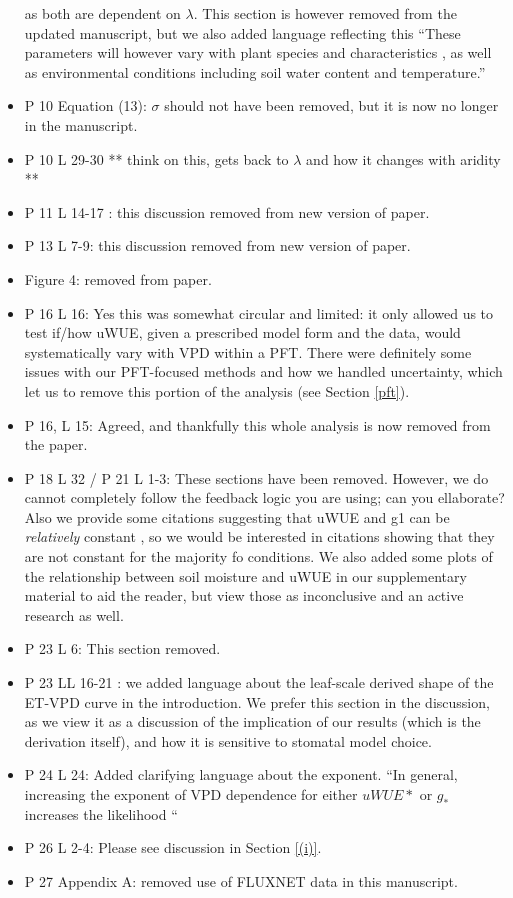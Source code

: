 \documentclass[12pt]{article}
\begin{document}
\begin{itemize}
  as both are dependent on $\lambda$. This section is however removed
  from the updated manuscript, but we also added language reflecting
  this ``These parameters will however vary with plant species and
  characteristics \citep[e.g. wood density, ][]{Lin_2015}, as well as
  environmental conditions including soil water content
  \citep{Manzoni2013} and temperature.''
\item P 10 Equation (13): $\sigma$ should not have been removed, but
  it is now no longer in the manuscript.
\item P 10 L 29-30 ** think on this, gets back to $\lambda$ and how it
  changes with aridity **
\item P 11 L 14-17 : this discussion removed from new version of
  paper.
\item P 13 L 7-9: this discussion removed from new version of paper.
\item Figure 4: removed from paper.
\item P 16 L 16: Yes this was somewhat circular and limited: it only
  allowed us to test if/how uWUE, given a prescribed model form
  and the data, would systematically vary with VPD within a PFT. There
  were definitely some issues with our PFT-focused methods and how we
  handled uncertainty, which let us to remove this portion of the
  analysis (see Section \ref{pft}).
\item P 16, L 15: Agreed, and thankfully this whole analysis is now
  removed from the paper.
\item P 18 L 32 / P 21 L 1-3: These sections have been
  removed. However, we do cannot completely follow the feedback logic
  you are using; can you ellaborate? Also we provide some citations
  suggesting that uWUE and g1 can be \textit{relatively} constant
  \citep{Lin_2005, Franks_2017, Zhou_2015}, so we would be interested
  in citations showing that they are not constant for the majority fo
  conditions. We also added some plots of the relationship between
  soil moisture and uWUE in our supplementary material to aid the
  reader, but view those as inconclusive and an active research as
  well.
\item P 23 L 6: This section removed.
\item P 23 LL 16-21 : we added language about the leaf-scale derived
  shape of the ET-VPD curve in the introduction. We prefer this
  section in the discussion, as we view it as a discussion of the
  implication of our results (which is the derivation itself), and how
  it is sensitive to stomatal model choice.
\item P 24 L 24: Added clarifying language about the exponent.
  ``In general, increasing the exponent of VPD dependence for
  either $uWUE*$ or $g_*$ increases the likelihood ``
\item P 26 L 2-4: Please see discussion in Section \ref{(i)}.
\item P 27 Appendix A: removed use of FLUXNET data in this manuscript.
\end{itemize}
\end{document}
